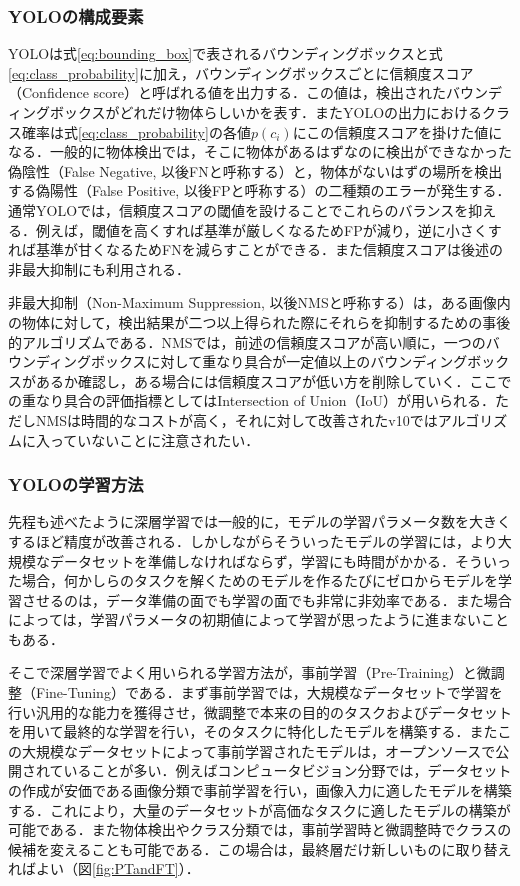         \subsubsection{YOLOの構成要素}
        \label{subsubsec:yolo_components}

        YOLOは式\ref{eq:bounding_box}で表されるバウンディングボックスと式\ref{eq:class_probability}に加え，バウンディングボックスごとに信頼度スコア（Confidence score）と呼ばれる値を出力する．この値は，検出されたバウンディングボックスがどれだけ物体らしいかを表す．またYOLOの出力におけるクラス確率は式\ref{eq:class_probability}の各値$p(c_i)$にこの信頼度スコアを掛けた値になる．一般的に物体検出では，そこに物体があるはずなのに検出ができなかった偽陰性（False Negative, 以後FNと呼称する）と，物体がないはずの場所を検出する偽陽性（False Positive, 以後FPと呼称する）の二種類のエラーが発生する．通常YOLOでは，信頼度スコアの閾値を設けることでこれらのバランスを抑える．例えば，閾値を高くすれば基準が厳しくなるためFPが減り，逆に小さくすれば基準が甘くなるためFNを減らすことができる．また信頼度スコアは後述の非最大抑制にも利用される．

        非最大抑制（Non-Maximum Suppression, 以後NMSと呼称する）は，ある画像内の物体に対して，検出結果が二つ以上得られた際にそれらを抑制するための事後的アルゴリズムである．NMSでは，前述の信頼度スコアが高い順に，一つのバウンディングボックスに対して重なり具合が一定値以上のバウンディングボックスがあるか確認し，ある場合には信頼度スコアが低い方を削除していく．ここでの重なり具合の評価指標としてはIntersection of Union（IoU）が用いられる．ただしNMSは時間的なコストが高く，それに対して改善されたv10ではアルゴリズムに入っていないことに注意されたい．

        \subsubsection{YOLOの学習方法}

        先程も述べたように深層学習では一般的に，モデルの学習パラメータ数を大きくするほど精度が改善される．しかしながらそういったモデルの学習には，より大規模なデータセットを準備しなければならず，学習にも時間がかかる．そういった場合，何かしらのタスクを解くためのモデルを作るたびにゼロからモデルを学習させるのは，データ準備の面でも学習の面でも非常に非効率である．また場合によっては，学習パラメータの初期値によって学習が思ったように進まないこともある．

        そこで深層学習でよく用いられる学習方法が，事前学習（Pre-Training）と微調整（Fine-Tuning）である\cite{radford2018improving}．まず事前学習では，大規模なデータセットで学習を行い汎用的な能力を獲得させ，微調整で本来の目的のタスクおよびデータセットを用いて最終的な学習を行い，そのタスクに特化したモデルを構築する．またこの大規模なデータセットによって事前学習されたモデルは，オープンソースで公開されていることが多い．例えばコンピュータビジョン分野では，データセットの作成が安価である画像分類で事前学習を行い，画像入力に適したモデルを構築する．これにより，大量のデータセットが高価なタスクに適したモデルの構築が可能である．また物体検出やクラス分類では，事前学習時と微調整時でクラスの候補を変えることも可能である．この場合は，最終層だけ新しいものに取り替えればよい（図\ref{fig:PTandFT}）．

